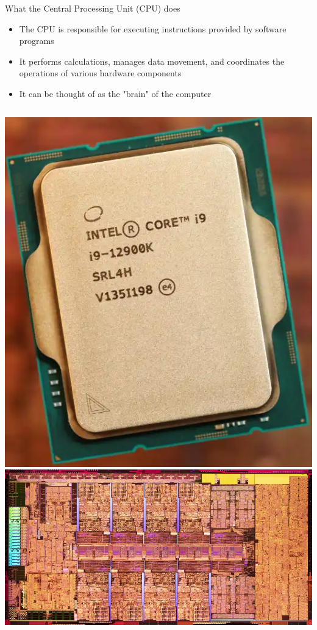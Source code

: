 \documentclass[12pt, aspectration=169]{beamer}
\begin{document}
    \begin{frame}{What the Central Processing Unit (CPU) does}
        \begin{itemize}
            \item The CPU is responsible for executing instructions provided by software programs
            \item It performs calculations, manages data movement, and coordinates the operations of various hardware components
            \item It can be thought of as the "brain" of the computer
        \end{itemize}
        \begin{center}
            \begin{columns}
                \includegraphics[scale=0.25]{static/images/12th_Gen_Core_i9_12900K_Hero_Close_Up}
                \includegraphics[scale=0.25]{static/images/900px-alder_lake_die_2}
            \end{columns}
        \end{center}
    \end{frame}
\end{document}
